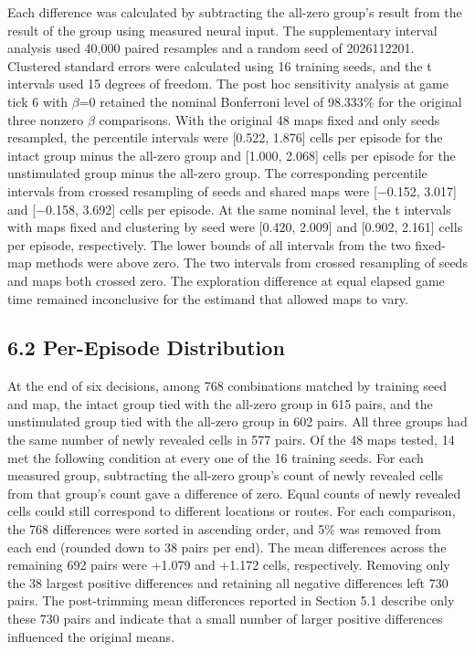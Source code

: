 \documentclass{article}
\begin{document}
Each difference was calculated by subtracting the all-zero group’s result from the result of the group using measured neural input. The supplementary interval analysis used 40,000 paired resamples and a random seed of 2026112201. Clustered standard errors were calculated using 16 training seeds, and the t intervals used 15 degrees of freedom. The post hoc sensitivity analysis at game tick 6 with \ensuremath{\beta}=0 retained the nominal Bonferroni level of 98.333\% for the original three nonzero \ensuremath{\beta} comparisons. With the original 48 maps fixed and only seeds resampled, the percentile intervals were [0.522, 1.876] cells per episode for the intact group minus the all-zero group and [1.000, 2.068] cells per episode for the unstimulated group minus the all-zero group. The corresponding percentile intervals from crossed resampling of seeds and shared maps were [\ensuremath{-}0.152, 3.017] and [\ensuremath{-}0.158, 3.692] cells per episode. At the same nominal level, the t intervals with maps fixed and clustering by seed were [0.420, 2.009] and [0.902, 2.161] cells per episode, respectively. The lower bounds of all intervals from the two fixed-map methods were above zero. The two intervals from crossed resampling of seeds and maps both crossed zero. The exploration difference at equal elapsed game time remained inconclusive for the estimand that allowed maps to vary.


\subsection*{6.2 Per-Episode Distribution}


At the end of six decisions, among 768 combinations matched by training seed and map, the intact group tied with the all-zero group in 615 pairs, and the unstimulated group tied with the all-zero group in 602 pairs. All three groups had the same number of newly revealed cells in 577 pairs. Of the 48 maps tested, 14 met the following condition at every one of the 16 training seeds. For each measured group, subtracting the all-zero group's count of newly revealed cells from that group's count gave a difference of zero. Equal counts of newly revealed cells could still correspond to different locations or routes. For each comparison, the 768 differences were sorted in ascending order, and 5\% was removed from each end (rounded down to 38 pairs per end). The mean differences across the remaining 692 pairs were +1.079 and +1.172 cells, respectively. Removing only the 38 largest positive differences and retaining all negative differences left 730 pairs. The post-trimming mean differences reported in Section 5.1 describe only these 730 pairs and indicate that a small number of larger positive differences influenced the original means.
\end{document}
